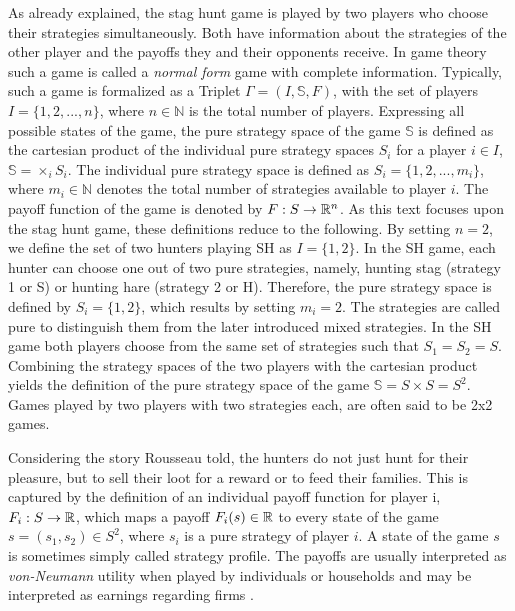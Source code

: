 \label{sec:traditional}
As already explained, the stag hunt game is played by 
two players who choose their
strategies simultaneously.
Both have information about the strategies of the
other player and the payoffs they and their opponents receive. In game theory
such a game is called a \textit{normal form} game with complete information. 
Typically, such a game is formalized as a Triplet $\Gamma = (I,\mathbb{S},F)$, 
with the set of players $I=\{1,2,...,n\}$, where $n \in \mathbb{N}$ is the 
total number of players. 
Expressing all possible states of the game, the pure
strategy space of the game $\mathbb{S}$ is defined as the cartesian
product of the individual pure strategy spaces $S_i$ for a player $i \in I$,
$\mathbb{S}=\times_i S_i$. The individual pure strategy space is defined as
$S_i = \{1,2,...,m_i\}$, where $m_i \in \mathbb{N}$ denotes the total 
number of strategies available to player $i$. 
The payoff 
function of the game is denoted by $F: S \rightarrow \mathbb{R}^n$.
As this text focuses upon the stag hunt game, these definitions reduce to the 
following.
By setting $n=2$, we define the set of two hunters playing SH as $I=\{1,2\}$. 
In the SH game, each hunter can choose one out of two pure strategies, namely, 
hunting stag (strategy 1 or S) or hunting hare (strategy 2 or H).
Therefore, the pure strategy space is defined by $S_i = \{1,2\}$, which results
by setting $m_i=2$. 
The strategies are called pure to distinguish
them from the later introduced mixed strategies. 
In the SH game both players choose from
the same set of strategies such that $S_1 =S_2=S$. Combining the strategy spaces
of the two players with the cartesian product
yields the definition of the pure strategy space of the game
$\mathbb{S}= S \times S = S^2$. Games played by two players with two strategies
each, are often said to be 2x2 games.    

Considering the story Rousseau told, the hunters do not just hunt
for their pleasure, but to sell their loot for a reward or to feed their 
families. 
This is captured by the definition of an individual payoff function for player
i, $F_i:S \rightarrow \mathbb{R}$, which maps a payoff $F_i(s) \in \mathbb{R}$ 
to every state of the game $s=(s_1,s_2) \in S^2$, where $s_i$ is a pure
strategy of player $i$. A state of the game $s$ is sometimes simply called 
strategy profile.
The payoffs are usually interpreted as \textit{von-Neumann} utility when 
played by individuals or households and may be interpreted as earnings 
regarding firms \parencite{fudenberg_theory_1998}. 

